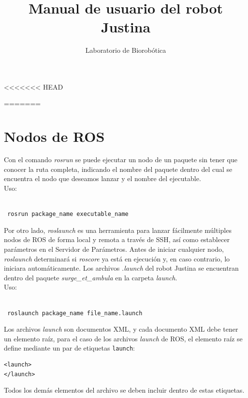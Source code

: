 \documentclass[12pt,twoside,final]{book}
\title{Manual de usuario del robot Justina}
\author{Laboratorio de Biorobótica}
\begin{document}
<<<<<<< HEAD

=======
\section{Nodos de ROS}
Con el comando \textit{rosrun} se puede ejecutar un nodo de un paquete sin tener que conocer la ruta completa, indicando el nombre del paquete dentro del cual se encuentra el nodo que deseamos lanzar y el nombre del ejecutable.\\

Uso:\\\\
\begin{verbatim}
 rosrun package_name executable_name
\end{verbatim}

Por otro lado, \textit{roslaunch} es una herramienta para lanzar fácilmente múltiples nodos de ROS de forma local y remota a través de SSH, así como establecer parámetros en el Servidor de Parámetros. Antes de iniciar cualquier nodo, \textit{roslaunch} determinará si \textit{roscore} ya está en ejecución y, en caso contrario, lo iniciara automáticamente. Los archivos \textit{.launch} del robot Justina se encuentran dentro del paquete \textit{surge\_et\_ambula} en la carpeta \textit{launch}.\\

Uso:\\\\
\begin{verbatim}
 roslaunch package_name file_name.launch
\end{verbatim}

Los archivos \textit{launch} son documentos XML, y cada documento XML debe tener un elemento raíz, para el caso de los archivos \textit{launch} de ROS, el elemento raíz se define mediante un par de etiquetas \texttt{launch}:

\begin{verbatim}
<launch>
</launch>
\end{verbatim}

Todos los demás elementos del archivo se deben incluir dentro de estas etiquetas.\\
\end{document}
